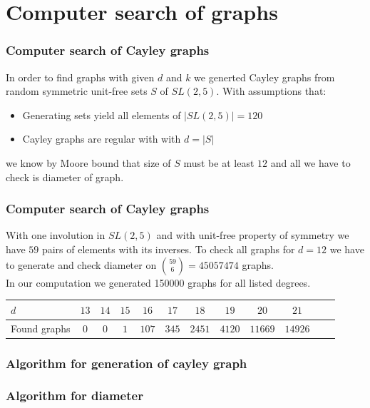 \documentclass{beamer}
\begin{document}
\section{Computer search of graphs} 
\begin{frame}
	\frametitle{Computer search of Cayley graphs}
	In order to find graphs with given $d$ and $k$ we generted Cayley graphs from random symmetric unit-free sets $S$ of $SL(2,5)$. 
	\medskip
	With assumptions that: 
	\begin{itemize}
		\item Generating sets yield all elements of $|SL(2,5)| = 120$
		\item Cayley graphs are regular with with $d=|S|$
	\end{itemize}
	we know by Moore bound that size of $S$ must be at least $12$ and all we have to check is diameter of graph. 
\end{frame}
\begin{frame}
	\frametitle{Computer search of Cayley graphs}
	With one involution in $SL(2,5)$ and with unit-free property of symmetry we have $59$ pairs of elements with its inverses. To check all graphs for $d=12$ we have to generate and check diameter on ${59 \choose 6} = 45057474$ graphs. \\
	In our computation we generated 150000 graphs for all listed degrees. \\
	\begin{tabular}[htbp]{l*{10}{c}r}
		$d$ & $13$ & $14$ & $15$ & $16$ & $17$ & $18$ & $19$ & $20$ & $21$ \\
		\hline
 		Found graphs & $0$  & $0$ & $1$ & $107$ & $345$ & $2451$  & $4120$ & $11669$ & $14926$ \\
	\end{tabular} 
\end{frame}
\begin{frame}
	\frametitle{Algorithm for generation of cayley graph}
	
\end{frame}
\begin{frame}
	\frametitle{Algorithm for diameter}
	
\end{frame}
\end{document}
